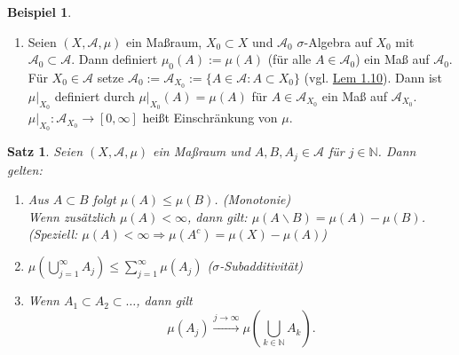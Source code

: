 \documentclass[a4paper]{report}
\newcommand{\N}{\mathbb{N}}
\newcommand{\jlabel}[1]{\label{j_#1}}
\newcommand{\jhyperref}[2]{\hyperref[j_#1]{#2}}
\newcommand{\jlink}[1]{\jhyperref{#1}{#1}}
\theoremstyle{plain}
\newtheorem{satz}[thm]{Satz}
\theoremstyle{definition}
\newtheorem{expl}[thm]{Beispiel}
\begin{document}
{{\begin{expl}
\begin{enumerate}
        \item
            Seien $(X, \mathcal{A}, \mu)$ ein Maßraum, $X_0 \subset X$ und $\mathcal{A}_0$ $\sigma$-Algebra auf $X_0$ mit $\mathcal{A}_0 \subset \mathcal{A}$. Dann definiert $\mu_0(A) := \mu(A)$ (für alle $A\in \mathcal{A}_0$) ein Maß auf $\mathcal{A}_0$.\\
            Für $X_0 \in \mathcal{A}$ setze $\mathcal{A}_0 := \mathcal{A}_{X_0} := \{A \in \mathcal{A}: A\subset X_0\}$ (vgl. \jlink{Lem 1.10}). Dann ist $\mu|_{X_0}$ definiert durch $\mu|_{X_0}(A) = \mu(A)$ für $A\in \mathcal{A}_{X_0}$ ein Maß auf $\mathcal{A}_{X_0}$. $\mu|_{X_0}: \mathcal{A}_{X_0} \rightarrow [0,\infty]$ heißt Einschränkung von $\mu$.
    \end{enumerate}
\end{expl}


\begin{satz}
\jlabel{Satz 1.14}
    Seien $(X, \mathcal{A}, \mu)$ ein Maßraum und $A,B,A_j \in \mathcal{A}$ für $j \in \N$. Dann gelten:
    \begin{enumerate}
        \item Aus $A\subset B$ folgt $\mu(A) \le \mu(B)$. (Monotonie)\\
            Wenn zusätzlich $\mu(A) < \infty$, dann gilt: $\mu(A\backslash B) = \mu(A) - \mu(B)$.\\
            (Speziell: $\mu(A) < \infty \Rightarrow \mu(A^c) = \mu(X) - \mu(A)$)
        \item $\mu(\bigcup_{j=1}^\infty A_j) \le \sum_{j=1}^\infty \mu(A_j)$ ($\sigma$-Subadditivität)
        \item Wenn $A_1 \subset A_2 \subset \dots$, dann gilt
        \begin{displaymath}
            \mu(A_j) \xrightarrow{j\rightarrow\infty} \mu \left(\bigcup_{k \in\N} A_k \right).
        \end{displaymath}


\end{enumerate}
\end{satz}}}
\end{document}

